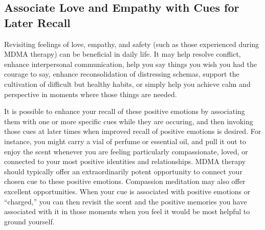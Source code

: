 \documentclass[12pt,letterpaper]{book}
\begin{document}
\subsection{Associate Love and Empathy with Cues for Later Recall}
Revisiting feelings of love, empathy, and safety (such as those experienced during MDMA therapy) can be beneficial in daily life. It may help resolve conflict, enhance interpersonal communication, help you say things you wish you had the courage to say, enhance reconsolidation of distressing schemas, support the cultivation of difficult but healthy habits, or simply help you achieve calm and perspective in moments where those things are needed.

It is possible to enhance your recall of these positive emotions by associating them with one or more specific cues while they are occuring, and then invoking those cues at later times when improved recall of positive emotions is desired. For instance, you might carry a vial of perfume or essential oil, and pull it out to enjoy the scent whenever you are feeling particularly compassionate, loved, or connected to your most positive identities and relationships. MDMA therapy should typically offer an extraordinarily potent opportunity to connect your chosen cue to these positive emotions. Compassion meditation may also offer excellent opportunities. When your cue is associated with positive emotions or “charged,” you can then revisit the scent and the positive memories you have associated with it in those moments when you feel it would be most helpful to ground yourself.
\end{document}
